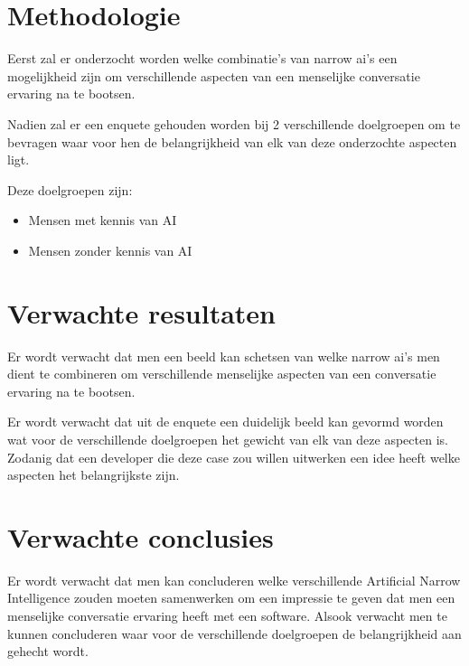 \section{Methodologie}
\label{sec:methodologie}
Eerst zal er onderzocht worden welke combinatie's van narrow ai's een mogelijkheid zijn om verschillende aspecten van een menselijke conversatie ervaring na te bootsen.

Nadien zal er een  enquete gehouden worden bij 2 verschillende doelgroepen om te bevragen waar voor hen de belangrijkheid van elk van deze onderzochte aspecten ligt.

Deze doelgroepen zijn:

\begin{itemize}
    \item Mensen met kennis van AI
    \item Mensen zonder kennis van AI
\end{itemize}

\section{Verwachte resultaten}
\label{sec:verwachte_resultaten}

Er wordt verwacht dat men een beeld kan schetsen van welke narrow ai's men dient te combineren om verschillende menselijke aspecten van een conversatie ervaring na te bootsen.

Er wordt verwacht dat uit de enquete een duidelijk beeld kan gevormd worden wat voor de verschillende doelgroepen het gewicht van elk van deze aspecten is. Zodanig dat een developer die deze case zou willen uitwerken een idee heeft welke aspecten het belangrijkste zijn.

\section{Verwachte conclusies}
\label{sec:verwachte_conclusies}

Er wordt verwacht dat men kan concluderen welke verschillende Artificial Narrow Intelligence zouden moeten samenwerken om een impressie te geven dat men een menselijke conversatie ervaring heeft met een software. Alsook verwacht men te kunnen concluderen waar voor de verschillende doelgroepen de belangrijkheid aan gehecht wordt.


